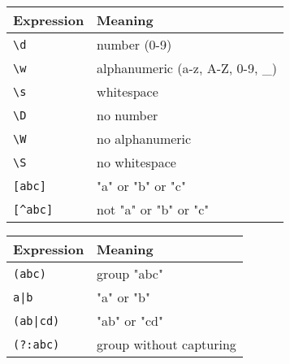 \documentclass[a4paper,10pt]{article}
\begin{document}
\begin{multicols}{2}
    \begin{tcolorbox}[colback=white, colframe=black, title=Character Classes]
        \renewcommand{\arraystretch}{1.3}
        \begin{tabular}{p{2cm}p{5cm}}
            \hline
            \textbf{Expression}         & \textbf{Meaning}              \\
            \hline
            \texttt{\textbackslash d} & number (0-9)                    \\
            \texttt{\textbackslash w} & alphanumeric (a-z, A-Z, 0-9, \_) \\
            \texttt{\textbackslash s} & whitespace                     \\
            \texttt{\textbackslash D} & no number                    \\
            \texttt{\textbackslash W} & no alphanumeric                \\
            \texttt{\textbackslash S} & no whitespace                \\
            \texttt{[abc]}            & "a" or "b" or "c"           \\
            \texttt{[\textasciicircum abc]}          & not "a" or "b" or "c"     \\
        \end{tabular}
    \end{tcolorbox}

    \begin{tcolorbox}[colback=white, colframe=black, title=Groups]
        \renewcommand{\arraystretch}{1.3}
        \begin{tabular}{p{2cm}p{5cm}}
            \hline
            \textbf{Expression} & \textbf{Meaning}      \\
            \hline
            \texttt{(abc)}    & group "abc"            \\
            \texttt{a|b}      & "a" or "b"            \\
            \texttt{(ab|cd)}  & "ab" or "cd"          \\
            \texttt{(?:abc)}  & group without capturing \\
        \end{tabular}
    \end{tcolorbox}


\end{multicols}
\end{document}
